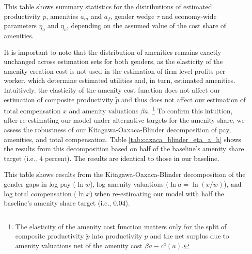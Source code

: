 %
\begin{table}[htbp!]
    \caption{Robustness: Estimation results under different assumed cost shares of amenities\label{tab:robustness_eta_a}}
    \resizebox{\textwidth}{!}{%
    
    }
    \begin{tablenotes}
        \footnotesize
        This table shows summary statistics for the distributions of estimated productivity $p$, amenities $a_{m}$ and $a_{f}$, gender wedge $\tau$ and economy-wide parameters $\eta_{a}$ and $\eta_{v}$, depending on the assumed value of the cost share of amenities. %
    \end{tablenotes}
    \begin{tablenotes}[Source]
        \sourcemodel%
    \end{tablenotes}
\end{table}
%

It is important to note that the distribution of amenities remains exactly unchanged across estimation sets for both genders, as the elasticity of the amenity creation cost is not used in the estimation of firm-level profits per worker, which determine estimated utilities and, in turn, estimated amenities. Intuitively, the elasticity of the amenity cost function does not affect our estimation of composite productivity $\tilde{p}$ and thus does not affect our estimation of total compensation $x$ and amenity valuations $\beta a$.%
%
\footnote{The elasticity of the amenity cost function matters only for the split of composite productivity $\tilde{p}$ into productivity $p$ and the net surplus due to amenity valuations net of the amenity cost $\beta a - c^{a}(a)$.} %
%
To confirm this intuition, after re-estimating our model under alternative targets for the amenity share, we assess the robustness of our Kitagawa-Oaxaca-Blinder decomposition of pay, amenities, and total compensation. Table \ref{tab:oaxaca_blinder_eta_a_h} shows the results from this decomposition based on half of the baseline's amenity share target (i.e., $4$ percent). The results are identical to those in our baseline.

%
\begin{table}[htbp!]
    \caption{Kitagawa-Oaxaca-Blinder decompositions---half baseline's amenity share target}
    \label{tab:oaxaca_blinder_eta_a_h}
    \resizebox{\textwidth}{!}{%
    
    }
    \begin{tablenotes}
        \footnotesize
        This table shows results from the Kitagawa-Oaxaca-Blinder decomposition of the gender gaps in log pay ($\ln w$), log amenity valuations ($\ln \tilde{a} = \ln(x/w)$), and log total compensation ($\ln x$) when re-estimating our model with half the baseline's amenity share target (i.e., $0.04$). %
    \end{tablenotes}
    \begin{tablenotes}[Source]
        \sourcemodel%
    \end{tablenotes}
\end{table}
%

